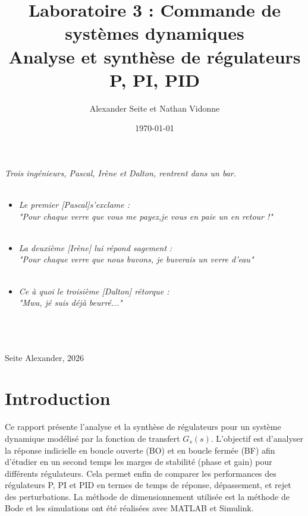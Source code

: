 \documentclass[11pt, a4paper]{article}
\title{
    \textbf{Laboratoire 3 : Commande de systèmes dynamiques} 
    \vspace{0.5cm}\\
    \large Analyse et synthèse de régulateurs P, PI, PID
}
\author{Alexander Seite et Nathan Vidonne}
\date{\today}
\begin{document}
\maketitle


\textit{Trois ingénieurs, Pascal, Irène et Dalton, rentrent dans un bar.}
\\\\
\begin{itemize}
    \item  \textit{Le premier [Pascal]s'exclame            : \\"Pour chaque verre que vous me payez,je vous en paie un en retour !"}\\\\
    \item  \textit{La deuxième [Irène] lui répond sagement : \\"Pour chaque verre que nous buvons, je buverais un verre d'eau"}\\\\
    \item  \textit{Ce à quoi le troisième [Dalton] rétorque : \\"Mwa, jé suis déjà beurré..."}\\\\
\end{itemize}

\\\\
Seite Alexander, 2026
\newpage

\tableofcontents
\newpage

\section{Introduction}

Ce rapport présente l'analyse et la synthèse de régulateurs pour un système dynamique
modélisé par la fonction de transfert $G_s(s)$. L'objectif est d'analyser la réponse
indicielle en boucle ouverte (BO) et en boucle fermée (BF) afin d'étudier en un second
temps les marges de stabilité (phase et gain) pour différents régulateurs. Cela permet
enfin de comparer les performances des régulateurs P, PI et
PID en termes de temps de réponse, dépassement, et rejet des perturbations.
La méthode de dimensionnement utilisée est la méthode de Bode et les simulations ont
été réalisées avec MATLAB et Simulink.\\[6pt]
\end{document}

